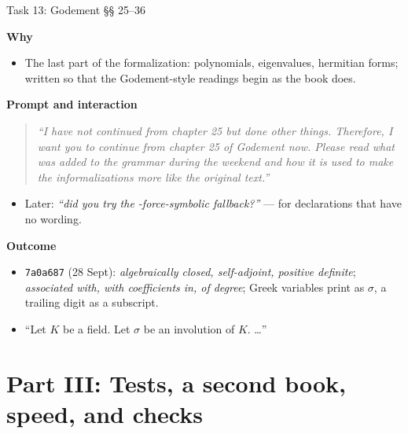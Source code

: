 \documentclass[10pt,aspectratio=169]{beamer}
\newcommand{\ok}[1]{\textcolor{good}{#1}}
\newcommand{\commit}[1]{\texttt{\footnotesize #1}}
\newcommand{\prompt}[1]{\begin{quote}\small\itshape ``#1''\end{quote}}
\newcommand{\why}{\par\textcolor{gfblue}{\textbf{Why}}\par}
\newcommand{\how}{\par\textcolor{gfblue}{\textbf{Prompt and interaction}}\par}
\newcommand{\what}{\par\textcolor{gfblue}{\textbf{Outcome}}\par}
\begin{document}
\begin{frame}{Task 13: Godement §§ 25--36}
  \why
  \begin{itemize}\small
    \item The last part of the formalization: polynomials, eigenvalues, hermitian forms;
          written so that the Godement-style readings begin as the book does.
  \end{itemize}
  \how
  \prompt{I have not continued from chapter 25 but done other things. Therefore, I
    want you to continue from chapter 25 of Godement now. Please read what was added
    to the grammar during the weekend and how it is used to make the informalizations
    more like the original text.}
  \begin{itemize}\small
    \item Later: \emph{``did you try the -force-symbolic fallback?''} ---
          for declarations that have no wording.
  \end{itemize}
  \what
  \begin{itemize}\small
    \item \commit{7a0a687} (28 Sept): \emph{algebraically closed, self-adjoint,
          positive definite}; \emph{associated with, with coefficients in, of degree};
          Greek variables print as $\sigma$, a trailing digit as a subscript.
    \item \ok{``Let $K$ be a field. Let $\sigma$ be an involution of $K$. \dots''}
  \end{itemize}
\end{frame}

\section{Part III: Tests, a second book, speed, and checks}
\end{document}
